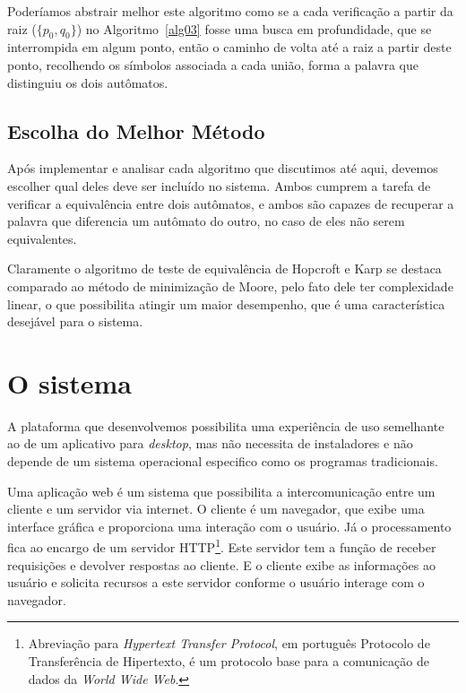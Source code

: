 \documentclass[
	12pt,				%
	openany,
	oneside,
	a4paper,			%
	english,			%
	brazil				%
	]{abntex2}
\begin{document}
  Poderíamos abstrair melhor este algoritmo como se a cada verificação a partir da raiz ($\{p_0, q_0\}$) no Algoritmo~\ref{alg03} fosse uma busca em profundidade, que se interrompida em algum ponto, então o caminho de volta até a raiz a partir deste ponto, recolhendo os símbolos associada a cada união, forma a palavra que distinguiu os dois autômatos.

\section{Escolha do Melhor Método}
  Após implementar e analisar cada algoritmo que discutimos até aqui, devemos escolher qual deles deve ser incluído no sistema. Ambos cumprem a tarefa de verificar a equivalência entre dois autômatos, e ambos são capazes de recuperar a palavra que diferencia um autômato do outro, no caso de eles não serem equivalentes.

  Claramente o algoritmo de teste de equivalência de Hopcroft e Karp se destaca comparado ao método de minimização de Moore, pelo fato dele ter complexidade linear, o que possibilita atingir um maior desempenho, que é uma característica desejável para o sistema.






 \chapter[O sistema] {O sistema}
  A plataforma que desenvolvemos possibilita uma experiência de uso semelhante ao de um aplicativo para \textit{desktop}, mas não necessita de instaladores e não depende de um sistema operacional especifico como os programas tradicionais.

  Uma aplicação web é um sistema que possibilita a intercomunicação entre um cliente e um servidor via internet. O cliente é um navegador, que exibe uma interface gráfica e proporciona uma interação com o usuário. Já o processamento fica ao encargo de um servidor HTTP\footnote{Abreviação para \textit{Hypertext Transfer Protocol}, em português Protocolo de Transferência de Hipertexto, é um protocolo base para a comunicação de dados da \textit{World Wide Web}.}. Este servidor tem a função de receber requisições e devolver respostas ao cliente. E o cliente exibe as informações ao usuário e solicita recursos a este servidor conforme o usuário interage com o navegador.
\end{document}
